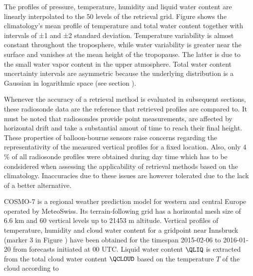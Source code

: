     The profiles of pressure, temperature, humidity and liquid water content
    are linearly interpolated to the 50 levels of the retrieval grid. Figure
     shows the climatology's mean profile of temperature and
    total water content together with intervals of ±1 and ±2 standard
    deviation. Temperature variability is almost constant throughout the
    troposphere, while water variability is greater near the surface and
    vanishes at the mean height of the tropopause. The latter is due to the
    small water vapor content in the upper atmosphere. Total water content
    uncertainty intervals are asymmetric because the underlying distribution is
    a Gaussian in logarithmic space (see section \in[ch:statevector]).

    Whenever the accuracy of a retrieval method is evaluated in subsequent
    sections, these radiosonde data are the reference that retrieved profiles
    are compared to. It must be noted that radiosondes provide point
    measurements, are affected by horizontal drift and take a substantial amout
    of time to reach their final height. These properties of balloon-bourne
    sensors raise concerns regarding the representativity of the measured
    vertical profiles for a fixed location. Also, only 4 \% of all radiosonde
    profiles were obtained during day time which has to be condsidered when
    assessing the applicability of retrieval methods based on the climatology.
    Inaccuracies due to these issues are however tolerated due to the lack of
    a better alternative.

            {}

\stopsection


\startsection[title=COSMO-7 Simulated Soundings]

    COSMO-7 is a regional weather prediction model for western and central
    Europe operated by MeteoSwiss. Its terrain-following grid has a
    horizontal mesh size of 6.6 km and 60 vertical levels up to 21453
    m altitude. Vertical profiles of temperature, humidity and cloud water
    content for a gridpoint near Innsbruck (marker 3 in Figure
    ) have been obtained for the timespan 2015-02-06 to
    2016-01-20 from forecasts initiated at 00 UTC. Liquid water content
    $\QLIQ$ is extracted from the total cloud water content $\QCLOUD$ based on
    the temperature $T$ of the cloud according to

